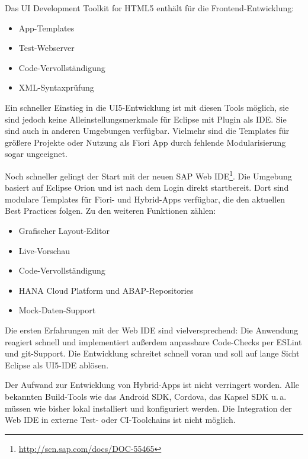 Das UI Development Toolkit for HTML5 enthält für die Frontend-Entwicklung:
\begin{itemize}
	\item App-Templates
	\item Test-Webserver
	\item Code-Vervollständigung
	\item XML-Syntaxprüfung
\end{itemize}
Ein schneller Einstieg in die UI5-Entwicklung ist mit diesen Tools möglich, sie sind jedoch keine Alleinstellungsmerkmale für Eclipse mit Plugin als \ac{IDE}. Sie sind auch in anderen Umgebungen verfügbar. Vielmehr sind die Templates für größere Projekte oder Nutzung als Fiori App durch fehlende Modularisierung sogar ungeeignet.

Noch schneller gelingt der Start mit der neuen SAP Web IDE\footnote{\url{http://scn.sap.com/docs/DOC-55465}}. Die Umgebung basiert auf Eclipse Orion und ist nach dem Login direkt startbereit. Dort sind modulare Templates für Fiori- und Hybrid-Apps verfügbar, die den aktuellen Best Practices folgen. Zu den weiteren Funktionen zählen:
\begin{itemize}
	\item Grafischer Layout-Editor 
	\item Live-Vorschau
	\item Code-Vervollständigung
	\item HANA Cloud Platform und ABAP-Repositories
	\item Mock-Daten-Support
\end{itemize}
Die ersten Erfahrungen mit der Web IDE sind vielversprechend: Die Anwendung reagiert schnell und implementiert außerdem anpassbare Code-Checks per ESLint und git-Support. Die Entwicklung schreitet schnell voran und soll auf lange Sicht Eclipse als UI5-IDE ablösen. 

Der Aufwand zur Entwicklung von Hybrid-Apps ist nicht verringert worden. Alle bekannten Build-Tools wie das Android SDK, Cordova, das Kapsel SDK u.\,a. müssen wie bisher lokal installiert und konfiguriert werden. Die Integration der Web IDE in externe Test- oder CI-Toolchains ist nicht möglich.

